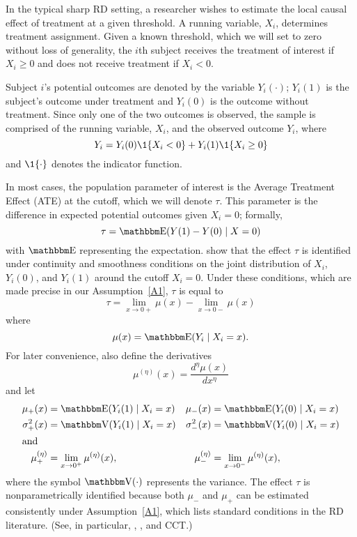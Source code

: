 \documentclass[12pt,fleqn]{article}
\begin{document}
In the typical sharp RD setting, a researcher wishes to estimate the local
causal effect of treatment at a given threshold. A running variable, $X_{i}$,
determines treatment assignment.  Given a known threshold, which we
will set to zero without loss of generality, the $i$th subject receives the
treatment of interest if $X_{i} \geq 0$ and does not receive treatment if
$X_{i} < 0$.

Subject $i$'s potential outcomes are denoted by the variable $Y_i(\cdot)$;
$Y_i(1)$ is the subject's outcome under treatment and $Y_i(0)$
is the outcome without treatment. Since only one of the two
outcomes is observed, the sample is comprised of the running variable, $X_{i}$,
and the observed outcome $Y_i$, where
\begin{equation*}
  Y_{i}=Y_{i}(0) \1\{X_{i}<0\}+Y_{i}(1) \1\{X_{i} \geq 0\}
\end{equation*}
and $\1\{ \cdot\}$ denotes the indicator function.

In most cases, the population parameter of interest is the Average Treatment
Effect (ATE) at the cutoff, which we will denote $\tau$. This parameter is the
difference in expected potential outcomes given $X_i = 0$; formally,
\begin{equation*}
  \tau=\E(Y(1)-Y(0) \mid X=0)
\end{equation*}
with $\E$ representing the expectation.
\cite{HTV2001} show that the effect $\tau$ is identified under continuity and
smoothness conditions on the joint distribution of $X_i$, $Y_i(0)$, and $Y_i(1)$
around the cutoff $X_i = 0$. Under these conditions, which are made precise
in our Assumption~\ref{A1}, $\tau$ is equal to
\begin{equation*}
  \tau = \lim_{x \to 0+} \mu(x) - \lim_{x \to 0-} \mu(x)
\end{equation*}
where
\begin{equation*}
  \mu(x)= \E(Y_{i} \mid X_{i}=x).
\end{equation*}
For later convenience, also define the derivatives
\begin{equation*}
  \mu^{(\eta)}(x)=\frac{d^{\eta}\mu(x)}{dx^{\eta}}
\end{equation*}
and let
\begin{align*}
  \mu_{+}(x)
  &= \E( Y_{i}(1) \mid X_{i}=x )
  &\mu_{-}(x)
  &= \E( Y_{i}(0) \mid X_{i}=x ) \\
  \sigma^{2}_{+}(x) &= \V( Y_{i}(1) \mid X_{i}=x )
  &\sigma^{2}_{-}(x)&=\V( Y_{i}(0) \mid X_{i}=x ) \\
\intertext{and}
  \mu^{(\eta)}_{+}
  &= \lim_{x \rightarrow 0^{+}}\mu^{(\eta)}(x),
  &\mu^{(\eta)}_{-}
  &= \lim_{x \rightarrow 0^{-}}\mu^{(\eta)}(x),
\end{align*}
where the symbol $\V(\cdot)$ represents the variance.  The effect $\tau$ is
nonparametrically identified because both $\mu_-$ and $\mu_+$ can be estimated
consistently under Assumption~\ref{A1}, which lists standard conditions in the
RD literature. (See, in particular, \citealp{HTV2001}, \citealp{Porter03}, and
CCT.)
\end{document}
